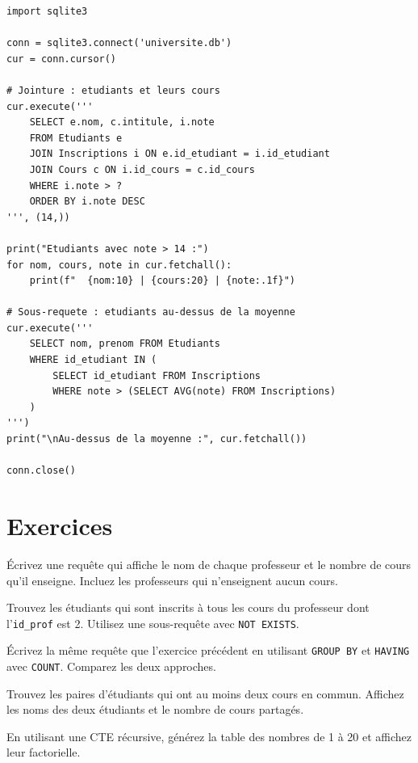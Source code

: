 \begin{codeblock}[title=\textbf{Jointures et sous-requ\^etes avec Python}]
\begin{verbatim}
import sqlite3

conn = sqlite3.connect('universite.db')
cur = conn.cursor()

# Jointure : etudiants et leurs cours
cur.execute('''
    SELECT e.nom, c.intitule, i.note
    FROM Etudiants e
    JOIN Inscriptions i ON e.id_etudiant = i.id_etudiant
    JOIN Cours c ON i.id_cours = c.id_cours
    WHERE i.note > ?
    ORDER BY i.note DESC
''', (14,))

print("Etudiants avec note > 14 :")
for nom, cours, note in cur.fetchall():
    print(f"  {nom:10} | {cours:20} | {note:.1f}")

# Sous-requete : etudiants au-dessus de la moyenne
cur.execute('''
    SELECT nom, prenom FROM Etudiants
    WHERE id_etudiant IN (
        SELECT id_etudiant FROM Inscriptions
        WHERE note > (SELECT AVG(note) FROM Inscriptions)
    )
''')
print("\nAu-dessus de la moyenne :", cur.fetchall())

conn.close()
\end{verbatim}
\end{codeblock}

\section*{Exercices}

\begin{exercice}
\'Ecrivez une requ\^ete qui affiche le nom de chaque professeur et le nombre
de cours qu'il enseigne. Incluez les professeurs qui n'enseignent aucun cours.
\end{exercice}

\begin{exercice}
Trouvez les \'etudiants qui sont inscrits \`a tous les cours du professeur
dont l'\texttt{id\_prof} est 2. Utilisez une sous-requ\^ete avec \texttt{NOT EXISTS}.
\end{exercice}

\begin{exercice}
\'Ecrivez la m\^eme requ\^ete que l'exercice pr\'ec\'edent en utilisant
\texttt{GROUP BY} et \texttt{HAVING} avec \texttt{COUNT}.
Comparez les deux approches.
\end{exercice}

\begin{exercice}
Trouvez les paires d'\'etudiants qui ont au moins deux cours en commun.
Affichez les noms des deux \'etudiants et le nombre de cours partag\'es.
\end{exercice}

\begin{exercice}
En utilisant une CTE r\'ecursive, g\'en\'erez la table des nombres de 1 \`a 20
et affichez leur factorielle.
\end{exercice}
